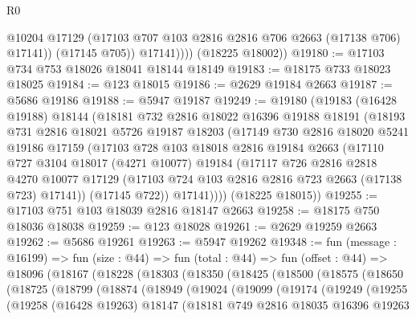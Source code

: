 \begin{lexlean}{R0}
\begin{coremodule}
                  @10204
                  @17129
                  (@17103 @707 @103 @2816 @2816 @706 @2663 (@17138 @706) @17141))
                (@17145 @705))
              @17141))))
      (@18225 @18002))
@19180 := @17103 @734 @753 @18026 @18041 @18144 @18149
@19183 := @18175 @733 @18023 @18025
@19184 := @123 @18015
@19186 := @2629 @19184 @2663
@19187 := @5686 @19186
@19188 := @5947 @19187
@19249 := @19180
    (@19183
      (@16428 @19188)
      @18144
      (@18181
        @732
        @2816
        @18022
        @16396
        @19188
        @18191
        (@18193
          @731
          @2816
          @18021
          @5726
          @19187
          @18203
          (@17149
            @730
            @2816
            @18020
            @5241
            @19186
            @17159
            (@17103
              @728
              @103
              @18018
              @2816
              @19184
              @2663
              (@17110
                @727
                @3104
                @18017
                (@4271 @10077)
                @19184
                (@17117
                  @726
                  @2816
                  @2818
                  @4270
                  @10077
                  @17129
                  (@17103 @724 @103 @2816 @2816 @723 @2663 (@17138 @723) @17141))
                (@17145 @722))
              @17141))))
      (@18225 @18015))
@19255 := @17103 @751 @103 @18039 @2816 @18147 @2663
@19258 := @18175 @750 @18036 @18038
@19259 := @123 @18028
@19261 := @2629 @19259 @2663
@19262 := @5686 @19261
@19263 := @5947 @19262
@19348 := fun (message : @16199) =>
  fun (size : @44) =>
  fun (total : @44) =>
  fun (offset : @44) =>
  @18096
    (@18167
      (@18228
        (@18303
          (@18350
            (@18425
              (@18500
                (@18575
                  (@18650
                    (@18725
                      (@18799
                        (@18874
                          (@18949
                            (@19024
                              (@19099
                                (@19174
                                  (@19249
                                    (@19255
                                      (@19258
                                        (@16428 @19263)
                                        @18147
                                        (@18181
                                          @749
                                          @2816
                                          @18035
                                          @16396
                                          @19263

\end{coremodule}
\end{lexlean}
